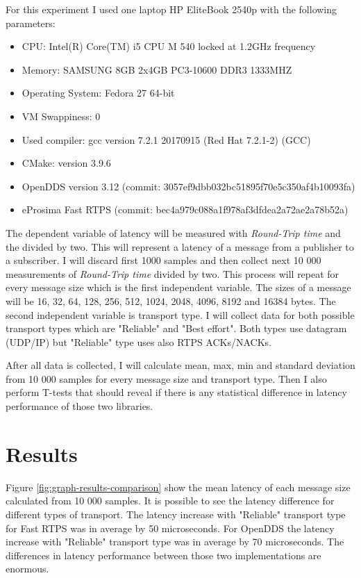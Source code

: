 \documentclass{csfourzero}
\begin{document}
For this experiment I used one laptop HP EliteBook 2540p with the following parameters: 

\begin{itemize}
	\item CPU: Intel(R) Core(TM) i5 CPU M 540 locked at 1.2GHz frequency
	\item Memory: SAMSUNG 8GB 2x4GB PC3-10600 DDR3 1333MHZ
	\item Operating System: Fedora 27 64-bit
	\item VM Swappiness: 0
	\item Used compiler: gcc version 7.2.1 20170915 (Red Hat 7.2.1-2) (GCC)
	\item CMake: version 3.9.6
	\item OpenDDS version 3.12 (commit: 3057ef9dbb032bc51895f70e5c350af4b10093fa) 
	\item eProsima Fast RTPS (commit: bec4a979c088a1f978af3dfdea2a72ae2a78b52a)
\end{itemize}

The dependent variable of latency will be measured with \textit{Round-Trip time} and the divided by two. This will represent a latency of a message from a publisher to a subscriber. I will discard first 1000 samples and then collect next 10 000 measurements of \textit{Round-Trip time} divided by two. This process will repeat for every message size which is the first independent variable. The sizes of a message will be 16, 32, 64, 128, 256, 512, 1024, 2048, 4096, 8192 and 16384 bytes. The second independent variable is transport type. I will collect data for both possible transport types which are "Reliable" and "Best effort". Both types use datagram (UDP/IP) but "Reliable" type uses also RTPS ACKs/NACKs.

After all data is collected, I will calculate mean, max, min and standard deviation from 10 000 samples for every message size and transport type. Then I also perform T-tests that should reveal if there is any statistical difference in latency performance of those two libraries.

\section{Results}
\label{sec:results}

\quad Figure \ref{fig:graph-results-comparison} show the mean latency of each message size calculated from 10 000 samples. It is possible to see the latency difference for different types of transport. The latency increase with "Reliable" transport type for Fast RTPS was in average by 50 microseconds. For OpenDDS the latency increase with "Reliable" transport type was in average by 70 microseconds. The differences in latency performance between those two implementations are enormous.
\end{document}
